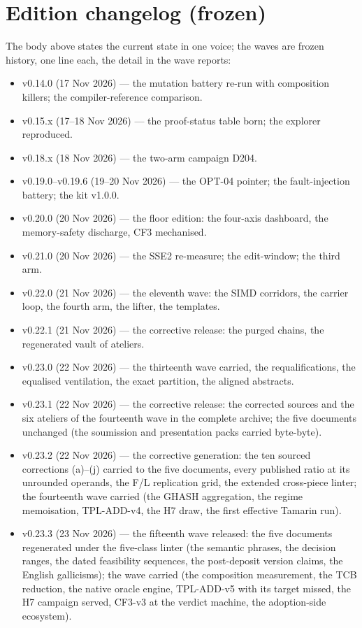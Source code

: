 \documentclass[10pt,a4paper]{article}
\begin{document}
\section*{Edition changelog (frozen)}\label{sec:changelog}
\noindent The body above states the current state in one voice; the waves are frozen history, one line each, the detail in the wave reports:
\begin{itemize}\itemsep2pt
\item v0.14.0 (17 Nov 2026) --- the mutation battery re-run with composition killers; the compiler-reference comparison.
\item v0.15.x (17--18 Nov 2026) --- the proof-status table born; the explorer reproduced.
\item v0.18.x (18 Nov 2026) --- the two-arm campaign D204.
\item v0.19.0--v0.19.6 (19--20 Nov 2026) --- the OPT-04 pointer; the fault-injection battery; the kit v1.0.0.
\item v0.20.0 (20 Nov 2026) --- the floor edition: the four-axis dashboard, the memory-safety discharge, CF3 mechanised.
\item v0.21.0 (20 Nov 2026) --- the SSE2 re-measure; the edit-window; the third arm.
\item v0.22.0 (21 Nov 2026) --- the eleventh wave: the SIMD corridors, the carrier loop, the fourth arm, the lifter, the templates.
\item v0.22.1 (21 Nov 2026) --- the corrective release: the purged chains, the regenerated vault of ateliers.
\item v0.23.0 (22 Nov 2026) --- the thirteenth wave carried, the requalifications, the equalised ventilation, the exact partition, the aligned abstracts.
\item v0.23.1 (22 Nov 2026) --- the corrective release: the corrected sources and the six ateliers of the fourteenth wave in the complete archive; the five documents unchanged (the soumission and presentation packs carried byte-byte).
\item v0.23.2 (22 Nov 2026) --- the corrective generation: the ten sourced corrections (a)--(j) carried to the five documents, every published ratio at its unrounded operands, the F/L replication grid, the extended cross-piece linter; the fourteenth wave carried (the GHASH aggregation, the regime memoisation, TPL-ADD-v4, the H7 draw, the first effective Tamarin run).
\item v0.23.3 (23 Nov 2026) --- the fifteenth wave released: the five documents regenerated under the five-class linter (the semantic phrases, the decision ranges, the dated feasibility sequences, the post-deposit version claims, the English gallicisms); the wave carried (the composition measurement, the TCB reduction, the native oracle engine, TPL-ADD-v5 with its target missed, the H7 campaign served, CF3-v3 at the verdict machine, the adoption-side ecosystem).

\end{itemize}
\end{document}

